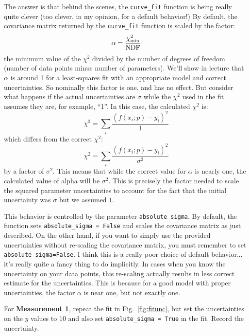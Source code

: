 The answer is that behind the scenes, the {\tt curve{\_}fit} function
is being really quite clever (too clever, in my opinion, for a default
behavior!)  By default, the covariance matrix returned by the 
{\tt curve{\_}fit} function is scaled by the factor:
\begin{displaymath}
\alpha = \frac{\chi^2_{\rm min}}{\rm NDF}
\end{displaymath}
the minimum value of the $\chi^2$ divided by the number of degrees of
freedom (number of data points minus number of parameters).  We'll
show in lecture that $\alpha$ is around 1 for a least-squares fit with
an appropriate model and correct uncertainties.  So nominally this
factor is one, and has no effect.  But consider what happens if the
actual uncertainties are $\sigma$ while the $\chi^2$ used in the fit assumes they
are, for example, ``1''.  In this case, the calculated $\chi^2$ is:
\begin{displaymath}
\chi^2 = \sum_i \frac{(f(x_i;p) - y_i) ^2}{1}
\end{displaymath}
which differs from the correct $\chi^2$:
\begin{displaymath}
\chi^2 = \sum_i \frac{(f(x_i;p) - y_i) ^2}{\sigma^2}
\end{displaymath}
by a factor of $\sigma^2$.  This means that while the correct value
for $\alpha$ is nearly one, the calculated value of alpha will be
$\sigma^2$.  This is precisely the factor needed to scale the squared
parameter uncertainties to account for the fact that the initial
uncertainty was $\sigma$ but we assumed $1$.

This behavior is controlled by the parameter {\tt absolute{\_}sigma}.
By default, the function sets {\tt absolute{\_}sigma = False} and
scales the covariance matrix as just described.  On the other hand, if
you want to simply use the provided uncertainties without re-scaling
the covariance matrix, you must remember to set {\tt
  absolute{\_}sigma=False}.  I think this is a really poor choice of
default behavior...  it's really quite a fancy thing to do implicitly.
In cases when you know the uncertainty on your data points, this
re-scaling actually results in less correct estimate for the
uncertainties.  This is because for a good model with proper
uncertainties, the factor $\alpha$ is near one, but not exactly one.

For {\bf Measurement 1}, repeat the fit in Fig.~\ref{fig:fitunc}, but
set the uncertainties on the $y$ values to 10 and also set 
{\tt absolute{\_}sigma = True} in the fit.  Record the uncertainty.

